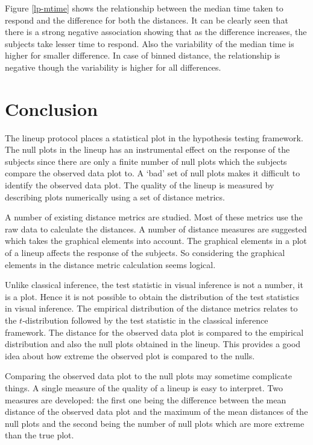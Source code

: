 \documentclass[12]{article}
\begin{document}
Figure \ref{lp-mtime} shows the relationship between the median time taken to respond and the difference for both the distances. It can be clearly seen that there is a strong negative association showing that as the difference increases, the subjects take lesser time to respond. Also the variability of the median time is higher for smaller difference. In case of binned distance, the relationship is negative though the variability is higher for all differences.


\section{Conclusion}

The lineup protocol places a statistical plot in the hypothesis testing framework. The null plots in the lineup has an instrumental effect on the response of the subjects since there are only a finite number of null plots which the subjects compare the observed data plot to. A `bad' set of null plots makes it difficult to identify the observed data plot. The quality of the lineup is measured by describing plots numerically using a set of distance metrics. 

A number of existing distance metrics are studied. Most of these metrics use the raw data to calculate the distances. A number of distance measures are suggested which takes the graphical elements into account. The graphical elements in a plot of a lineup affects the response of the subjects. So considering the graphical elements in the distance metric calculation seems logical.

Unlike classical inference, the test statistic in visual inference is not a number, it is a plot. Hence it is not possible to obtain the distribution of the test statistics in visual inference. The empirical distribution of the distance metrics relates to the $t$-distribution followed by the test statistic in the classical inference framework. The distance for the observed data plot is compared to the empirical distribution and also the null plots obtained in the lineup. This provides a good idea about how extreme the observed plot is compared to the nulls.

Comparing the observed data plot to the null plots may sometime complicate things. A single measure of the quality of a lineup is easy to interpret. Two measures are developed: the first one being the difference between the mean distance of the observed data plot and the maximum of the mean distances of the null plots and the second being the number of null plots which are more extreme than the true plot.
\end{document}
